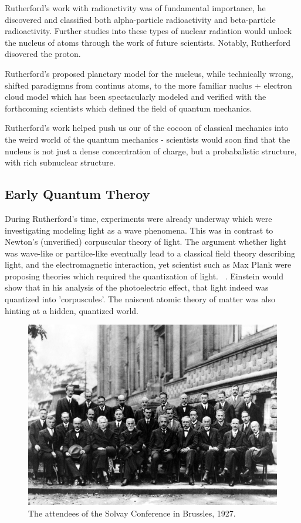 Rutherford's work with radioactivity was of fundamental importance, he
discovered and classified both alpha-particle radioactivity and beta-particle
radioactivity. Further studies into these types of nuclear radiation would
unlock the nucleus of atoms through the work of future scientists. Notably,
Rutherford disovered the proton.

Rutherford's proposed planetary model for the nucleus, while technically wrong,
shifted paradigmns from continus atoms, to the more familiar nuclus + electron
cloud model which has been spectacularly modeled and verified with the
forthcoming scientists which defined the field of quantum mechanics.

Rutherford's work helped push us our of the cocoon of classical mechanics into
the weird world of the quantum mechanics - scientists would soon find that the
nucleus is not just a dense concentration of charge, but a probabalistic
structure, with rich subnuclear structure.

\clearpage
\subsection{Early Quantum Theroy}

During Rutherford's time, experiments were already underway which were
investigating modeling light as a wave phenomena. This was in contrast to
Newton's (unverified) corpuscular theory of light. The argument whether light
was wave-like or partilce-like eventually lead to a classical field theory
describing light, and the electromagnetic interaction, yet scientist such as Max
Plank were proposing theories which required the quantization of light.
~\needcite{}. Einstein would show that in his analysis of the photoelectric
effect, that light indeed was quantized into 'corpuscules'. The naiscent atomic
theory of matter was also hinting at a hidden, quantized world.

\begin{figure}
	\centering
	\includegraphics[width=0.7\linewidth]{../Chapter2/fig/solvay.jpg}
	\caption{
		The attendees of the Solvay Conference in Brussles, 1927.
	}
	\label{fig:solvay}
\end{figure}

